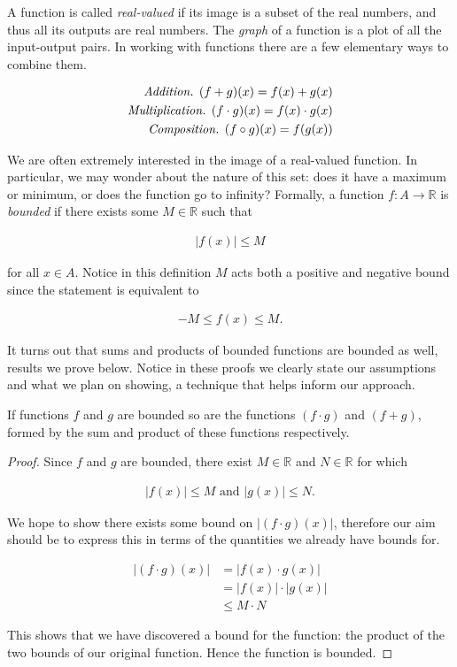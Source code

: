 A function is called \emph{real-valued} if its image is a subset of the real numbers, and thus all its outputs are real numbers. The \emph{graph} of a function is a plot of all the input-output pairs. In working with functions there are a few elementary ways to combine them.

\begin{align}
	\emph{Addition. } (f + g)(x) = f(x) + g(x) \\
	\emph{Multiplication. } (f \cdot g)(x) = f(x) \cdot g(x) \\
	\emph{Composition. } (f \circ g)(x) = f(g(x))
\end{align}

We are often extremely interested in the image of a real-valued function. In particular, we may wonder about the nature of this set: does it have a maximum or minimum, or does the function go to infinity? Formally, a function $f: A \rightarrow \mathbb{R}$ is \emph{bounded} if there exists some $M \in \mathbb{R}$ such that

\begin{align*}
	|f(x)| \le M
\end{align*}

for all $x \in A$. Notice in this definition $M$ acts both a positive and negative bound since the statement is equivalent to

\begin{align*}
	-M \le f(x) \le M.
\end{align*}

It turns out that sums and products of bounded functions are bounded as well, results we prove below. Notice in these proofs we clearly state our assumptions and what we plan on showing, a technique that helps inform our approach.

\vspace{\baselineskip}
\begin{theorem}
	If functions $f$ and $g$ are bounded so are the functions $(f \cdot g)$ and $(f + g)$, formed by the sum and product of these functions respectively.
\end{theorem}

\begin{proof}
	Since $f$ and $g$ are bounded, there exist $M \in \mathbb{R}$ and $N \in \mathbb{R}$ for which 
	
	\begin{align*}
		|f(x)| \le M \text{ and } |g(x)| \le N.
	\end{align*}
	
	We hope to show there exists some bound on $|(f \cdot g)(x)|$, therefore our aim should be to express this in terms of the quantities we already have bounds for.
	
	\begin{align*}
		|(f \cdot g)(x)| &= |f(x) \cdot g(x)| \\
		&= |f(x)| \cdot |g(x)| \\
		&\le M \cdot N
	\end{align*}
	
	This shows that we have discovered a bound for the function: the product of the two bounds of our original function. Hence the function is bounded.
\end{proof}

